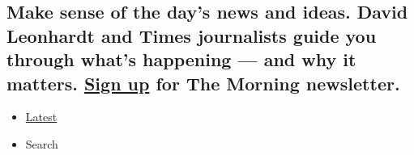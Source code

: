 \hypertarget{make-sense-of-the-days-news-and-ideas-david-leonhardt-and-times-journalists-guide-you-through-whats-happening--and-why-it-matters-sign-up-for-the-morning-newsletter-1}{%
\subsection{\texorpdfstring{Make sense of the day's news and ideas.
David Leonhardt and Times journalists guide you through what's happening
--- and why it matters.
\href{https://www.nytimes3xbfgragh.onion/newsletters/morning-briefing}{Sign
up} for The Morning
newsletter.}{Make sense of the day's news and ideas. David Leonhardt and Times journalists guide you through what's happening --- and why it matters. Sign up for The Morning newsletter.}}\label{make-sense-of-the-days-news-and-ideas-david-leonhardt-and-times-journalists-guide-you-through-whats-happening--and-why-it-matters-sign-up-for-the-morning-newsletter-1}}

\begin{itemize}
\tightlist
\item
  \protect\hyperlink{stream-panel}{Latest}
\item
  Search
\end{itemize}

